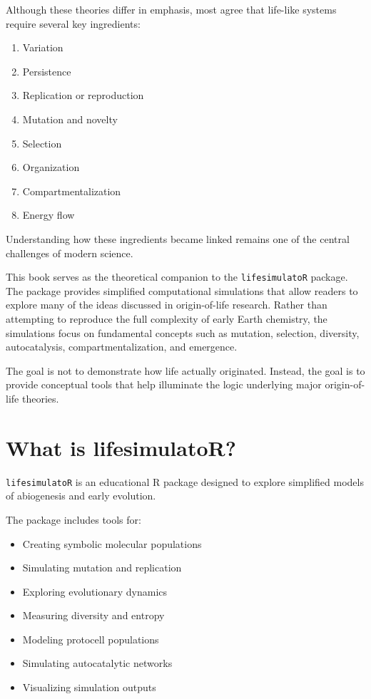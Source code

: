 \documentclass[
  oneside,
  openany]{book}
\providecommand{\tightlist}{%
  \setlength{\itemsep}{0pt}\setlength{\parskip}{0pt}}
\begin{document}
Although these theories differ in emphasis, most agree that life-like systems require several key ingredients:

\begin{enumerate}
\def\labelenumi{\arabic{enumi}.}
\tightlist
\item
  Variation
\item
  Persistence
\item
  Replication or reproduction
\item
  Mutation and novelty
\item
  Selection
\item
  Organization
\item
  Compartmentalization
\item
  Energy flow
\end{enumerate}

Understanding how these ingredients became linked remains one of the central challenges of modern science.

This book serves as the theoretical companion to the \texttt{lifesimulatoR} package. The package provides simplified computational simulations that allow readers to explore many of the ideas discussed in origin-of-life research. Rather than attempting to reproduce the full complexity of early Earth chemistry, the simulations focus on fundamental concepts such as mutation, selection, diversity, autocatalysis, compartmentalization, and emergence.

The goal is not to demonstrate how life actually originated. Instead, the goal is to provide conceptual tools that help illuminate the logic underlying major origin-of-life theories.

\section*{What is lifesimulatoR?}\label{what-is-lifesimulator}

\texttt{lifesimulatoR} is an educational R package designed to explore simplified models of abiogenesis and early evolution.

The package includes tools for:

\begin{itemize}
\tightlist
\item
  Creating symbolic molecular populations
\item
  Simulating mutation and replication
\item
  Exploring evolutionary dynamics
\item
  Measuring diversity and entropy
\item
  Modeling protocell populations
\item
  Simulating autocatalytic networks
\item
  Visualizing simulation outputs
\end{itemize}
\end{document}
